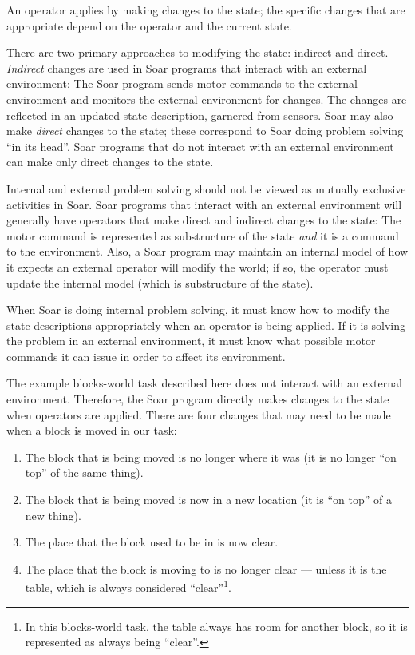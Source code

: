 An operator applies by making changes to the state; the specific changes
that are appropriate depend on the operator and the current state.

There are two primary approaches to modifying the state: indirect and direct.
\emph{Indirect} changes are used in Soar programs that interact with
an external environment: The Soar program sends motor commands to the
external environment and monitors the external environment for
changes. The changes are reflected in an updated state description,
garnered from sensors. Soar may also make \emph{direct} changes to the
state; these correspond to Soar doing problem solving ``in its
head''. Soar programs that do not interact with an external environment
can make only direct changes to the state.

Internal and external problem solving should not be viewed as mutually
exclusive activities in Soar. Soar programs that interact with an
external environment will generally have operators that make direct and
indirect changes to the state: The motor command is represented as
substructure of the state \emph{and} it is a command to the environment. Also, a Soar program may maintain an internal
model of how it expects an external operator will modify the world; if
so, the operator must update the internal model (which is substructure
of the state).

When Soar is doing internal problem solving, it must know how to modify
the state descriptions appropriately when an operator is being
applied. If it is solving the problem in an external environment, it
must know what possible motor commands it can issue in order to affect
its environment.

The example blocks-world task described here does not interact with an external
environment. Therefore, the Soar program directly makes changes to the state
when operators are applied. There are four changes that may need to be made
when a block is moved in our task: \vspace{-14pt}
\label{LIST:blocks-app}
\begin{enumerate}
\item The block that is being moved is no longer where it was (it is no longer
   	``on top'' of the same thing).\vspace{-6pt}
\item The block that is being moved is now in a new location (it is ``on top''
	of a new thing).\vspace{-6pt}
\item The place that the block used to be in is now clear.\vspace{-6pt}
\item The place that the block is moving to is no longer clear --- unless it
	is the table, which is always considered ``clear''\footnote{In this
	blocks-world task, the table always has room for another block, so it
	is represented as always being ``clear''.}.
\end{enumerate}

